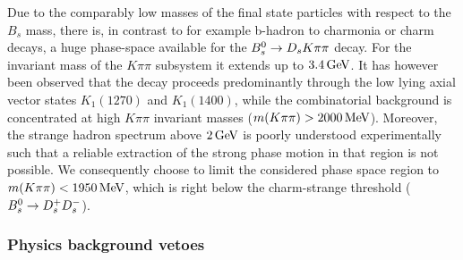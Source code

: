 Due to the comparably low masses of the final state particles  with respect to the $B_s$ mass,
there is, in contrast to for example b-hadron to charmonia or charm decays, a huge phase-space available for the ${{B}^0_{s}}\rightarrow{\ensuremath{{D}_{s}}}{\ensuremath{K}}{\ensuremath{\pi}}{\ensuremath{\pi}}$ decay.
For the invariant mass of the $K\pi\pi$ subsystem it extends up to $3.4 \mathrm{\,Ge\kern -0.1em V}$.
It has however been observed that the decay proceeds predominantly through the low lying axial vector states $K_{1}(1270)$ and $K_{1}(1400)$, while
the combinatorial background is concentrated at high $K\pi\pi$ invariant masses ($m(K\pi\pi) > 2000 \mathrm{\,Me\kern -0.1em V}$).
Moreover, the strange hadron spectrum above $2\mathrm{\,Ge\kern -0.1em V}$ is poorly understood experimentally such that a reliable extraction of the strong phase motion in that region is not possible.
We consequently choose to limit the considered phase space region to $m(K\pi\pi) < 1950 \mathrm{\,Me\kern -0.1em V}$, which is right below the charm-strange threshold (${{B}^0_{s}}\rightarrow{\ensuremath{{D}^+_{s}}}{\ensuremath{{D}^-_{s}}}$).
 
 \clearpage
\subsubsection{Physics background vetoes}

